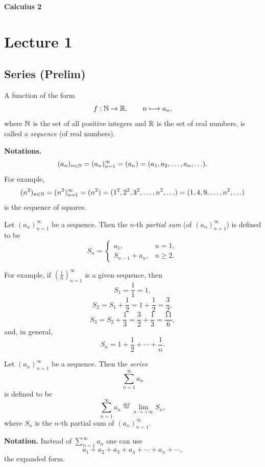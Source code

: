 
{\large\bfseries Calculus 2}

\section{Lecture 1}
\subsection*{Series (Prelim)}

\begin{definition}\label{def:1.1}
A function of the form
\[
 f:\mathbb{N}\to\mathbb{R},\qquad n\longmapsto a_n,
\]
where $\mathbb{N}$ is the set of all positive integers and $\mathbb{R}$ is the set of real numbers, is called a \emph{sequence} (of real numbers).
\end{definition}

\noindent\textbf{Notations.}
\[
 (a_n)_{n\in\mathbb{N}}=(a_n)_{n=1}^{\infty}=(a_n)=(a_1,a_2,\ldots,a_n,\ldots).
\]
For example,
\[
 (n^2)_{n\in\mathbb{N}}=(n^2)_{n=1}^{\infty}=(n^2)
 =(1^2,2^2,3^2,\ldots,n^2,\ldots)
 =(1,4,9,\ldots,n^2,\ldots)
\]
is the sequence of squares.

\begin{definition}\label{def:1.2}
Let $(a_n)_{n=1}^{\infty}$ be a sequence. Then the $n$-th \emph{partial sum} (of $(a_n)_{n=1}^{\infty}$) is defined to be
\[
S_n=
\begin{cases}
 a_1, & n=1,\\[2mm]
 S_{n-1}+a_n, & n\ge 2.
\end{cases}
\]
\end{definition}

For example, if $\left(\frac1n\right)_{n=1}^{\infty}$ is a given sequence, then
\[
S_1=\frac11=1,
\]
\[
S_2=S_1+\frac12=1+\frac12=\frac32,
\]
\[
S_3=S_2+\frac13=\frac32+\frac13=\frac{11}{6},
\]
and, in general,
\[
S_n=1+\frac12+\cdots+\frac1n.
\]

\begin{definition}\label{def:1.3}
Let $(a_n)_{n=1}^{\infty}$ be a sequence. Then the \emph{series}
\[
\sum_{n=1}^{\infty}a_n
\]
is defined to be
\[
\sum_{n=1}^{\infty}a_n\overset{\mathrm{def}}{=}\lim_{n\to+\infty}S_n,
\]
where $S_n$ is the $n$-th partial sum of $(a_n)_{n=1}^{\infty}$.
\end{definition}

\noindent\textbf{Notation.} Instead of $\sum_{n=1}^{\infty}a_n$ one can use
\[
a_1+a_2+a_3+a_4+\cdots+a_n+\cdots,
\]
the expanded form.

